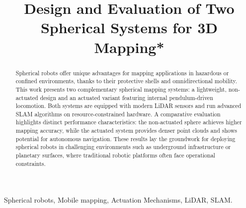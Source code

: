 \documentclass[conference]{IEEEtran}
\begin{document}
\title{Design and Evaluation of  Two Spherical Systems for 3D Mapping*\\

}

\author{
}

\maketitle

\begin{abstract}
Spherical robots offer unique advantages for mapping applications in hazardous or confined environments, thanks to their protective shells and omnidirectional mobility. This work presents two complementary spherical mapping systems: a lightweight, non-actuated design and an actuated variant featuring internal pendulum-driven locomotion. Both systems are equipped with modern LiDAR sensors and run advanced SLAM algorithms on resource-constrained hardware. A comparative evaluation highlights distinct performance characteristics: the non-actuated sphere achieves higher mapping accuracy, while the actuated system provides denser point clouds and shows potential for autonomous navigation. These results lay the groundwork for deploying spherical robots in challenging environments such as underground infrastructure or planetary surfaces, where traditional robotic platforms often face operational constraints.
\end{abstract}

\begin{IEEEkeywords}
Spherical robots, Mobile mapping, Actuation Mechanisms, LiDAR, SLAM.
\end{IEEEkeywords}
\end{document}
